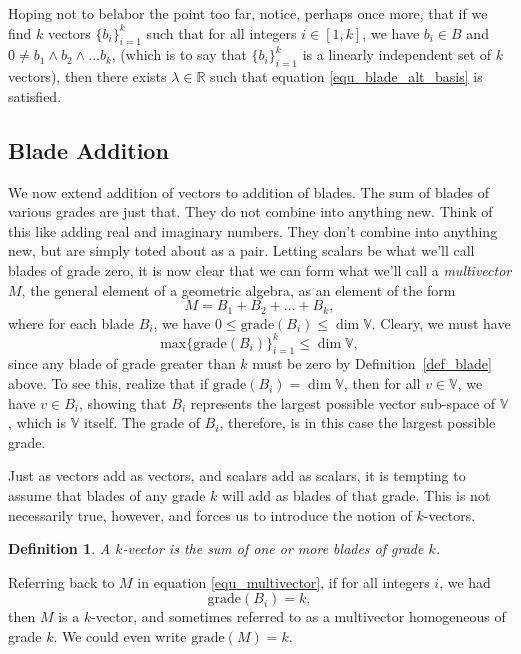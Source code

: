 \documentclass[12pt]{article}
\numberwithin{equation}{section}
\newcommand{\V}{\mathbb{V}}
\newcommand{\R}{\mathbb{R}}
\newcommand{\grade}{\mbox{grade}}
\newtheorem{definition}{Definition}[section]
\begin{document}
Hoping not to belabor the point too far, notice, perhaps once more,
that if we find $k$ vectors $\{b_i\}_{i=1}^k$ such that for all integers $i\in[1,k]$,
we have $b_i\in B$ and $0\neq b_1\wedge b_2\wedge\dots b_k$, (which is to say that
$\{b_i\}_{i=1}^k$ is a linearly independent set of $k$ vectors), then there exists
$\lambda\in\R$ such that equation \eqref{equ_blade_alt_basis} is satisfied.

\subsection{Blade Addition}

We now extend addition of vectors to addition of blades.  The sum of blades
of various grades are just that.  They do not combine into anything new.
Think of this like adding real and imaginary numbers.  They don't combine
into anything new, but are simply toted about as a pair.  Letting scalars
be what we'll call blades of grade zero, it is now clear that we can form
what we'll call a {\it multivector} $M$, the general element of a geometric algebra,
as an element of the form
\begin{equation}\label{equ_multivector}
M = B_1 + B_2 + \dots + B_k,
\end{equation}
where for each blade $B_i$, we have $0\leq\mbox{grade}(B_i)\leq\dim\V$.
Cleary, we must have
\begin{equation}
\mbox{max}\{\mbox{grade}(B_i)\}_{i=1}^k\leq\dim\V,
\end{equation}
since any blade of grade greater than $k$ must be zero by Definition~\ref{def_blade} above.
To see this, realize that if $\mbox{grade}(B_i)=\dim\V$, then for all $v\in\V$, we have $v\in B_i$,
showing that $B_i$ represents the largest possible vector sub-space of $\V$, which is $\V$ itself.  The
grade of $B_i$, therefore, is in this case the largest possible grade.

Just as vectors add as vectors, and scalars add as scalars, it is tempting to assume
that blades of any grade $k$ will add as blades of that grade.  This is not necessarily true, however,
and forces us to introduce the notion of $k$-vectors.
\begin{definition}\label{def_k_vector}
A $k$-vector is the sum of one or more blades of grade $k$.
\end{definition}
Referring back to $M$ in equation \eqref{equ_multivector}, if for all integers $i$, we had
\begin{equation*}
\grade(B_i)=k,
\end{equation*}
then $M$ is a $k$-vector, and sometimes referred
to as a multivector homogeneous of grade $k$.
We could even write $\grade(M)=k$.
\end{document}
